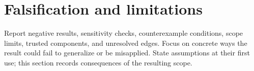 \section{Falsification and limitations}

Report negative results, sensitivity checks, counterexample conditions, scope
limits, trusted components, and unresolved edges. Focus on concrete ways the
result could fail to generalize or be misapplied. State assumptions at their
first use; this section records consequences of the resulting scope.
